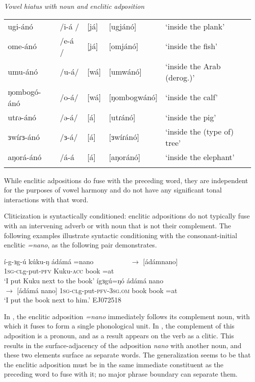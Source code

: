 \ea \textit{Vowel hiatus with noun and enclitic adposition}\\
\begin{tabular}[t]{lllll}
\lsptoprule
ugi-ánó 	&	/i-á /&	[já]	&	[ugjánó] &	‘inside the plank’\\
ome-ánó 	&	/e-á /&	[já]	&	[omjánó]  &	‘inside the fish’\\
umu-ánó 	&	/u-á/ &	[wá]	&	[umwánó]  &	‘inside the Arab (derog.)’\\
ŋombogó-ánó &	/o-á/ &	[wá]	&	[ŋombogwánó]& ‘inside the calf’\\
utɾə-ánó 	&	/ə-á/ &	[á] 	&	[utɾánó]  &	‘inside the pig’\\
ɜwíɾɜ-ánó 	&	/ɜ-á/ &	[á] 	&	[ɜwíɾánó] &	‘inside the (type of) tree’\\
aŋorá-ánó 	&	/á-á  &	[á] 	&	[aŋoránó] &	‘inside the elephant’\\
\lspbottomrule
\end{tabular}
\z
While enclitic adpositions do fuse with the preceding word, they are independent for the purposes of vowel harmony and do not have any significant tonal interactions with that word.

Cliticization is syntactically conditioned: enclitic adpositions do not typically fuse with an intervening adverb or with noun that is not their complement. The following examples illustrate syntactic conditioning with the consonant-initial enclitic \textit{=nano}, as the following pair demonstrates.

\ea \ea í-g-ɜg-ú kúku-ŋ ádámá =nano {\ \ \ \ \ \ \ \ \ \ $\to$ [ádámnano]} \\
\textsc{1sg-cl}g-put-\textsc{pfv} Kuku-\textsc{acc} book =at {}\\
`I put Kuku next to the book' \label{ex:ch13:bookat} 
\ex ígɜgú=ŋó ádámá nano {\ \ \ \ \ \ \ \ \ \ \ \ \ \ \ \ \ \ \ \ \ \ $\to$ [ádámá nano]} 
\textsc{1sg-cl}g-put-\textsc{pfv}-\textsc{3sg.om} book book =at {}\\
\glt `I put the book next to him.'\label{ex:ch13:himat} \hfill EJ072518 
\z 
\z

In , the enclitic adposition \textit{=nano} immediately follows its complement noun, with which it fuses to form a single phonological unit. In , the complement of this adposition is a pronoun, and as a result appears on the verb as a clitic. This results in the surface-adjacency of the adposition \textit{nano} with another noun, and these two elements surface as separate words. The generalization seems to be that the enclitic adposition must be in the same immediate constituent as the preceding word to fuse with it; no major phrase boundary can separate them.

